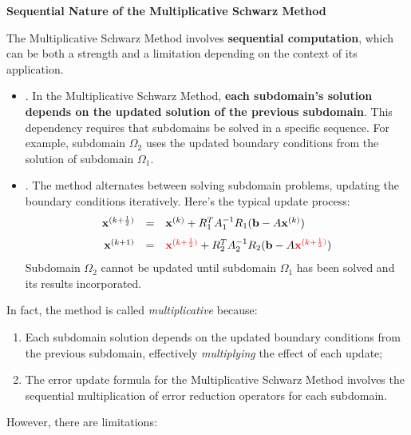 \highspace
\begin{flushleft}
    \textcolor{Green3}{ \textbf{Sequential Nature of the Multiplicative Schwarz Method}}
\end{flushleft}
The Multiplicative Schwarz Method involves \textbf{sequential computation}, which can be both a strength and a limitation depending on the context of its application. 
\begin{itemize}
    \item {}. In the Multiplicative Schwarz Method, \textbf{each subdomain's solution depends on the updated solution of the previous subdomain}. This dependency requires that subdomains be solved in a specific sequence. For example, subdomain $\Omega_{2}$ uses the updated boundary conditions from the solution of subdomain $\Omega_{1}$.


    \item {}. The method alternates between solving subdomain problems, updating the boundary conditions iteratively. Here's the typical update process:
    \begin{equation*}
        \begin{array}{rcl}
            \mathbf{x}^{(k+\frac{1}{2})} &=& \mathbf{x}^{(k)} + R_{1}^{T} A_{1}^{-1} R_{1} (\mathbf{b} - A \mathbf{x}^{(k)}) \\ [.7em]
            \mathbf{x}^{(k+1)} &=& \textcolor{Red2}{\mathbf{x}^{(k+\frac{1}{2})}} + R_{2}^{T} A_{2}^{-1} R_{2} (\mathbf{b} - A \textcolor{Red2}{\mathbf{x}^{(k+\frac{1}{2})}})
        \end{array}
    \end{equation*}
    Subdomain $\Omega_{2}$ cannot be updated until subdomain $\Omega_{1}$ has been solved and its results incorporated.
\end{itemize}
In fact, the method is called \emph{multiplicative} because:
\begin{enumerate}
    \item Each subdomain solution depends on the updated boundary conditions from the previous subdomain, effectively \emph{multiplying} the effect of each update;
    \item The error update formula for the Multiplicative Schwarz Method involves the sequential multiplication of error reduction operators for each subdomain.
\end{enumerate}
However, there are limitations:
